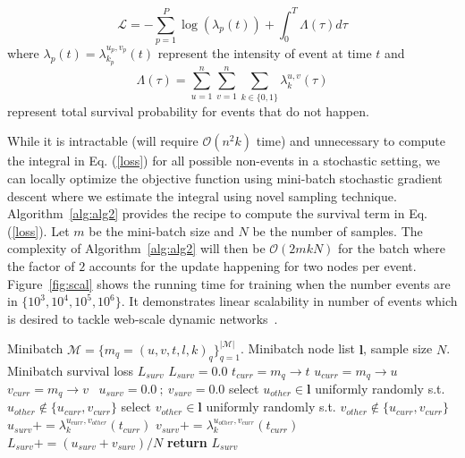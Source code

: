 \documentclass[11pt]{article}
\begin{document}
\begin{equation}\label{loss}
\mathcal{L} = - \sum_{p=1}^P \log\left(\lambda_p(t)\right) + \int_{0}^T\Lambda(\tau)d\tau
\end{equation}
where $\lambda_p(t) = \lambda^{u_p,v_p}_{k_p}(t)$ represent the intensity of event at time $t$  and $$\Lambda(\tau) = \sum_{u=1}^n\sum_{v=1}^n\sum_{k \in \{0,1\}} \lambda^{u,v}_k(\tau)$$
represent total survival probability for events that do not happen.

While it is intractable (will require $\mathcal{O}(n^2k)$ time) and unnecessary to compute the integral in Eq. (\ref{loss}) for all possible non-events in a stochastic setting, we can locally optimize the objective function using mini-batch stochastic gradient descent where we estimate the integral using novel sampling technique. 
Algorithm~\ref{alg:alg2} provides the recipe to compute the survival term in Eq. (\ref{loss}). Let $m$ be the mini-batch size and $N$ be the number of samples. The complexity of Algorithm~\ref{alg:alg2} will then be $\mathcal{O}(2mkN)$ for the batch where the factor of $2$ accounts for the update happening for two nodes per event. Figure~\ref{fig:scal} shows the running time for training when the number events are in  $\{10^3, 10^4, 10^5, 10^6 \}$. It demonstrates linear scalability in number of events which is desired to tackle web-scale dynamic networks~\cite{ParBenLes17}.

\begin{algorithm}[t!]
   \caption{Computation of integral term in Eq.~\ref{loss} for a mini-batch}
   \label{alg:alg2}
\begin{algorithmic}
    Minibatch $\mathcal{M} = \{m_q = (u, v, t, l, k)_q\}_{q=1}^{|\mathcal{M}|}$. Minibatch node list $\mathbf{l}$, sample size $N$.
    Minibatch survival loss $L_{surv}$
   \STATE
   \STATE $L_{surv}=0.0$
   \STATE $t_{curr} = m_q \rightarrow t$
   \STATE $u_{curr} = m_q \rightarrow u$~%
   \STATE $v_{curr} = m_q \rightarrow v$~%
   \STATE $u_{surv} = 0.0~;~v_{surv}=0.0$
   \STATE
   \STATE select $u_{other} \in \mathbf{l}$ uniformly randomly s.t. $u_{other} \notin \{u_{curr}, v_{curr}\} $
   \STATE select $v_{other} \in \mathbf{l}$ uniformly randomly s.t. $v_{other} \notin \{u_{curr}, v_{curr}\} $
   \STATE $u_{surv} += \lambda_k^{u_{curr},v_{other}}(t_{curr})$
   \STATE $v_{surv} += \lambda_k^{u_{other},v_{curr}}(t_{curr})$
   \ENDFOR
   \ENDFOR
   \STATE$L_{surv} += (u_{surv} + v_{surv}) / N$
   \ENDFOR
   \STATE \textbf{return} $L_{surv}$
\end{algorithmic}
\end{algorithm}
\end{document}
